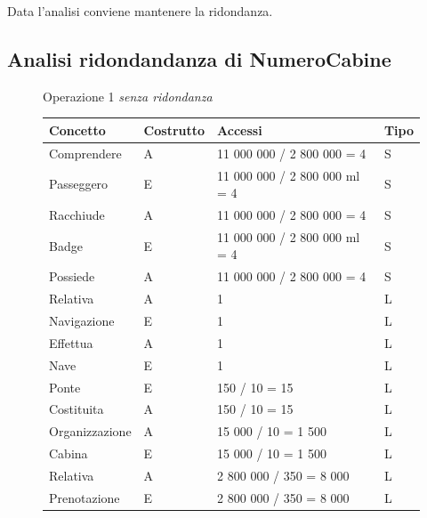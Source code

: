 \documentclass[a4paper, titlepage]{report}
\begin{document}
\noindent
Data l'analisi conviene mantenere la ridondanza.

\newpage
\subsection*{Analisi ridondandanza di NumeroCabine}

    \begin{figure}[h]
		\centering
		Operazione 1 \textit{senza ridondanza}\\
		\begin{tabular}{L{3cm}C{2.5cm}C{4cm}C{2.5cm}}
			\rule[-2mm]{0mm}{0.65cm}{}
			\textbf{Concetto} & \textbf{Costrutto} &\textbf{Accessi} & \textbf{Tipo} \\
			\hline\rule[-2mm]{0mm}{0.65cm}{}
			Comprendere & A & 11 000 000 / 2 800 000 = 4 & S \\
			\hline\rule[-2mm]{0mm}{0.65cm}{}
			Passeggero & E & 11 000 000 / 2 800 000 ml = 4 & S \\
			\hline\rule[-2mm]{0mm}{0.65cm}{}
			Racchiude & A & 11 000 000 / 2 800 000 = 4 & S \\
			\hline\rule[-2mm]{0mm}{0.65cm}{}
			Badge & E & 11 000 000 / 2 800 000 ml = 4 & S \\
			\hline\rule[-2mm]{0mm}{0.65cm}{}
			Possiede & A & 11 000 000 / 2 800 000 = 4 & S \\
			\hline\rule[-2mm]{0mm}{0.65cm}{}
			Relativa & A & 1 & L \\
			\hline\rule[-2mm]{0mm}{0.65cm}{}
			Navigazione & E & 1 & L \\
			\hline\rule[-2mm]{0mm}{0.65cm}{}	
			Effettua & A & 1 & L \\
			\hline\rule[-2mm]{0mm}{0.65cm}{}
			Nave & E & 1 & L \\
			\hline\rule[-2mm]{0mm}{0.65cm}{}
			Ponte & E & 150 / 10 = 15 & L \\
			\hline\rule[-2mm]{0mm}{0.65cm}{}
			Costituita & A & 150 / 10 = 15 & L \\
			\hline\rule[-2mm]{0mm}{0.65cm}{}	
			Organizzazione & A & 15 000 / 10 = 1 500 & L \\
			\hline\rule[-2mm]{0mm}{0.65cm}{}
			Cabina & E & 15 000 / 10 = 1 500 & L \\
			\hline\rule[-2mm]{0mm}{0.65cm}{}
			Relativa & A & 2 800 000 / 350 = 8 000 & L \\
			\hline\rule[-2mm]{0mm}{0.65cm}{}
			Prenotazione & E & 2 800 000 / 350 = 8 000 & L \\

\end{tabular}
\end{figure}
\end{document}
